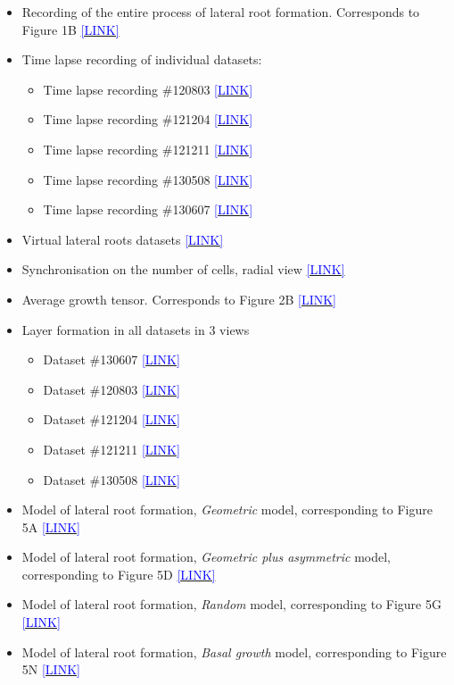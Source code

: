 \documentclass[11pt,a4paper, final]{article}
\begin{document}
\begin{itemize}
    \item Recording of the entire process of lateral root formation. Corresponds to Figure 1B \href{http://youtu.be/navcxqh7KCo}{\textcolor{blue}{[LINK]}}
    \item Time lapse recording of individual datasets:
    \begin{itemize}
    	\item Time lapse recording \#120803 \href{http://youtu.be/hvoDhoWLdSI}{\textcolor{blue}{[LINK]}}
        \item Time lapse recording \#121204 \href{http://youtu.be/bXf-gO8T0aQ}{\textcolor{blue}{[LINK]}}
        \item Time lapse recording \#121211 \href{http://youtu.be/ru7-g3KWV9E}{\textcolor{blue}{[LINK]}}
        \item Time lapse recording \#130508 \href{http://youtu.be/GApOwRMWmUU}{\textcolor{blue}{[LINK]}}
        \item Time lapse recording \#130607 \href{http://youtu.be/cFemfGbI5yA}{\textcolor{blue}{[LINK]}}
    \end{itemize}
    \item Virtual lateral roots datasets \href{http://youtu.be/EXIp3H0y5UI}{\textcolor{blue}{[LINK]}}
    \item Synchronisation on the number of cells, radial view \href{http://youtu.be/YZFkpcnyjiY}{\textcolor{blue}{[LINK]}}
    \item Average growth tensor. Corresponds to Figure 2B \href{https://youtu.be/unsGbA8-J-Y}{\textcolor{blue}{[LINK]}}
    \item Layer formation in all datasets in 3 views
    \begin{itemize}
        \item Dataset \#130607 \href{http://youtu.be/cdY3t1iVRF8}{\textcolor{blue}{[LINK]}}
        \item Dataset \#120803 \href{http://youtu.be/yXki6QpltZo}{\textcolor{blue}{[LINK]}}
        \item Dataset \#121204 \href{http://youtu.be/Bd_UgUVyzrM}{\textcolor{blue}{[LINK]}}
        \item Dataset \#121211 \href{http://youtu.be/NOouEVqpGj8}{\textcolor{blue}{[LINK]}}
        \item Dataset \#130508 \href{http://youtu.be/EajarNlRvtA}{\textcolor{blue}{[LINK]}}
    \end{itemize}		
    \item Model of lateral root formation, \emph{Geometric} model, corresponding to Figure 5A  \href{https://youtu.be/GLUKCE4nN3A}{\textcolor{blue}{[LINK]}}
        \item Model of lateral root formation, \emph{Geometric plus asymmetric} model, corresponding to Figure 5D  \href{https://youtu.be/ypBdyjFyqYw}{\textcolor{blue}{[LINK]}}
    \item Model of lateral root formation, \emph{Random} model, corresponding to Figure 5G  \href{https://youtu.be/V9xkyPfRQeM}{\textcolor{blue}{[LINK]}}
    \item Model of lateral root formation, \emph{Basal growth} model, corresponding to Figure 5N  \href{https://youtu.be/TZqwYTnmAgg}{\textcolor{blue}{[LINK]}}


\end{itemize}
\end{document}
